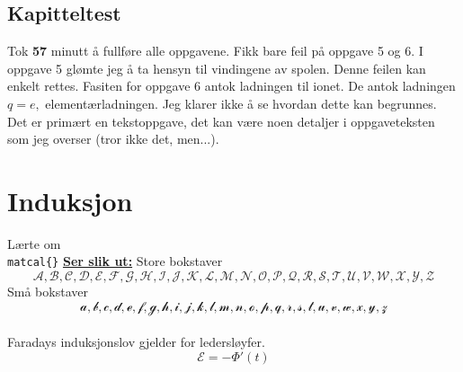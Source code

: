 \documentclass{article}
\numberwithin{equation}{section}
\begin{document}
\subsection{Kapitteltest}\label{sub:Kapitteltest} %
Tok \textbf{57} minutt å fullføre alle oppgavene. Fikk bare feil på oppgave 5 og 6. I oppgave 5 glømte jeg å ta hensyn til vindingene av spolen. Denne feilen kan enkelt rettes. Fasiten for oppgave 6 antok ladningen til ionet. De antok ladningen $q=e,$ elementærladningen. Jeg klarer ikke å se hvordan dette kan begrunnes. Det er primært en tekstoppgave, det kan være noen detaljer i oppgaveteksten som jeg overser (tror ikke det, men...).


\section{Induksjon}\label{sec:Induksjon} %
Lærte om \texttt{\\matcal\{\}} \newline
\underline{\textbf{Ser slik ut:}} \newline
Store bokstaver
\[ \mathcal{A, B, C, D, E, F, G, H, I, J, K, L, M, N, O, P, Q, R, S, T, U, V, W, X, Y, Z} \]
Små bokstaver
\[ \mathcal{a, b, c, d, e, f, g, h, i, j, k, l, m, n, o, p, q, r, s, t, u, v, w, x, y, z} \]
\\
Faradays induksjonslov gjelder for ledersløyfer.
\begin{equation}
  \mathcal{E} = -\Phi '(t)
  \label{eq:Faradays induksjonslov}
\end{equation}
\end{document}
